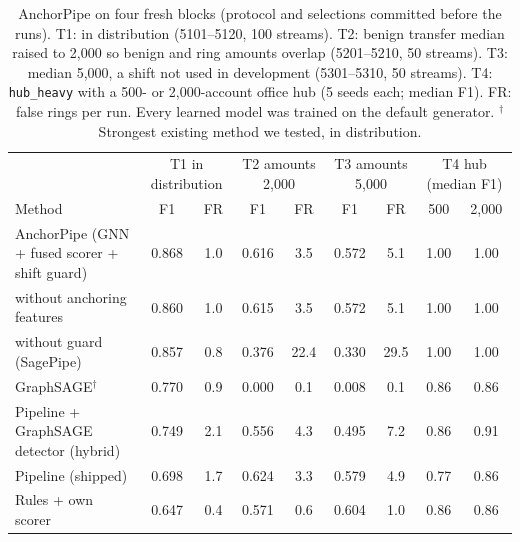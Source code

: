 \begin{table}[t]
\caption{AnchorPipe on four fresh blocks (protocol and selections committed before the runs). T1: in
distribution (5101--5120, 100 streams). T2: benign transfer median raised to 2{,}000 so benign and ring
amounts overlap (5201--5210, 50 streams). T3: median 5{,}000, a shift not used in development
(5301--5310, 50 streams). T4: \texttt{hub\_heavy} with a 500- or 2{,}000-account office hub (5 seeds
each; median F1). FR: false rings per run. Every learned model was trained on the default generator.
$^\dagger$Strongest existing method we tested, in distribution.}
\label{tab:anchor}
\small
\setlength{\tabcolsep}{3pt}
\begin{tabular}{lcccccccc}
\toprule
& \multicolumn{2}{c}{T1 in distribution} & \multicolumn{2}{c}{T2 amounts 2{,}000} & \multicolumn{2}{c}{T3 amounts 5{,}000} & \multicolumn{2}{c}{T4 hub (median F1)} \\
Method & F1 & FR & F1 & FR & F1 & FR & 500 & 2{,}000 \\
\midrule
AnchorPipe (GNN + fused scorer + shift guard) & 0.868 & 1.0 & 0.616 & 3.5 & 0.572 & 5.1 & 1.00 & 1.00 \\
\quad without anchoring features & 0.860 & 1.0 & 0.615 & 3.5 & 0.572 & 5.1 & 1.00 & 1.00 \\
\quad without guard (SagePipe) & 0.857 & 0.8 & 0.376 & 22.4 & 0.330 & 29.5 & 1.00 & 1.00 \\
GraphSAGE$^\dagger$ & 0.770 & 0.9 & 0.000 & 0.1 & 0.008 & 0.1 & 0.86 & 0.86 \\
Pipeline + GraphSAGE detector (hybrid) & 0.749 & 2.1 & 0.556 & 4.3 & 0.495 & 7.2 & 0.86 & 0.91 \\
Pipeline (shipped) & 0.698 & 1.7 & 0.624 & 3.3 & 0.579 & 4.9 & 0.77 & 0.86 \\
Rules + own scorer & 0.647 & 0.4 & 0.571 & 0.6 & 0.604 & 1.0 & 0.86 & 0.86 \\
\bottomrule
\end{tabular}
\end{table}
